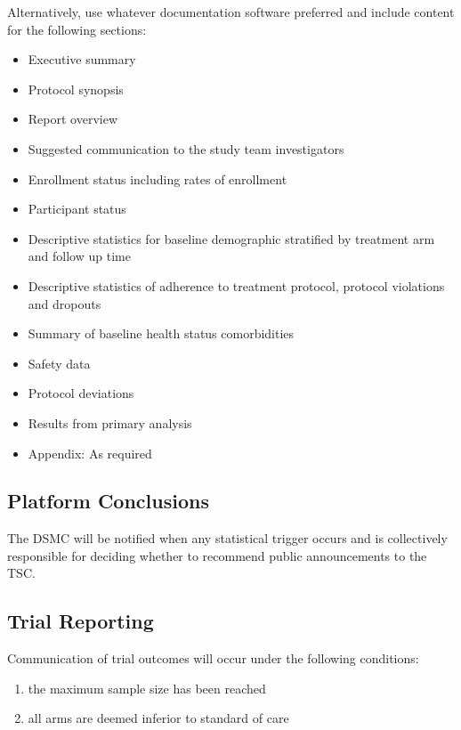 \documentclass[
]{article}
\providecommand{\tightlist}{%
  \setlength{\itemsep}{0pt}\setlength{\parskip}{0pt}}
\begin{document}
Alternatively, use whatever documentation software preferred and include content for the following sections:

\begin{itemize}
  \tightlist
  \item
        Executive summary
  \item
        Protocol synopsis
  \item
        Report overview
  \item
        Suggested communication to the study team investigators
  \item
        Enrollment status including rates of enrollment
  \item
        Participant status
  \item
        Descriptive statistics for baseline demographic stratified by treatment arm and follow up time
  \item
        Descriptive statistics of adherence to treatment protocol, protocol violations and dropouts
  \item
        Summary of baseline health status comorbidities
  \item
        Safety data
  \item
        Protocol deviations
  \item
        Results from primary analysis
  \item
        Appendix: As required
\end{itemize}


\hypertarget{platform-conclusions}{%
  \subsection{Platform Conclusions}\label{platform-conclusions}}

The DSMC will be notified when any statistical trigger occurs and is collectively responsible for deciding whether to recommend public announcements to the TSC.

\hypertarget{trial-reporting}{%
  \subsection{Trial Reporting}\label{trial-reporting}}

Communication of trial outcomes will occur under the following conditions:

\begin{enumerate}
  \def\labelenumi{\arabic{enumi}.}
  \tightlist
  \item
        the maximum sample size has been reached
  \item
        all arms are deemed inferior to standard of care
\end{enumerate}
\end{document}
